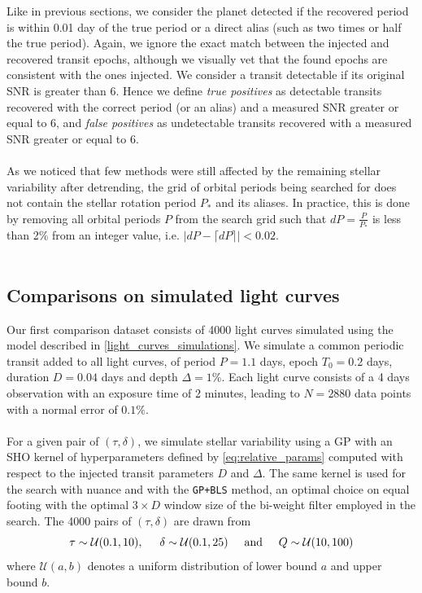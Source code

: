 \documentclass[modern]{aastex631}
\begin{document}
Like in previous sections, we consider the planet detected if the recovered period is within 0.01 day of the true period or a direct alias (such as two times or half the true period). Again, we ignore the exact match between the injected and recovered transit epochs, although we visually vet that the found epochs are consistent with the ones injected. We consider a transit detectable if its original SNR is greater than 6. Hence we define \textit{true positives} as detectable transits recovered with the correct period (or an alias) and a measured SNR greater or equal to 6, and \textit{false positives} as undetectable transits recovered with a measured SNR greater or equal to 6.\\\\As we noticed that few methods were still affected by the remaining stellar variability after detrending, the grid of orbital periods being searched for does not contain the stellar rotation period $P_*$ and its aliases. In practice, this is done by removing all orbital periods $P$ from the search grid such that $dP = \frac{P}{P_*}$ is less than 2\% from an integer value, i.e. $\vert  dP - \lceil dP \rceil \vert < 0.02$.\\\\
\subsection{Comparisons on simulated light curves}\label{simu}
Our first comparison dataset consists of 4000 light curves simulated using the model described in \autoref{light_curves_simulations}. We simulate a common periodic transit added to all light curves, of period $P=1.1$ days, epoch $T_0=0.2$ days, duration $D=0.04$ days and depth $\Delta=1\%$. Each light curve consists of a 4 days observation with an exposure time of 2 minutes, leading to $N=2880$ data points with a normal error of $0.1\%$.\\\\
For a given pair of $(\tau, \delta)$, we simulate stellar variability using a GP with an SHO kernel of hyperparameters defined by \autoref{eq:relative_params} computed with respect to the injected transit parameters $D$ and $\Delta$. The same kernel is used for the search with \textsf{nuance} and with the \texttt{GP+BLS} method, an optimal choice on equal footing with the optimal $3\times D$ window size of the bi-weight filter employed in the \wtls{} search.
The 4000 pairs of $(\tau, \delta)$ are drawn from
\begin{equation*}
    \tau \sim \mathcal{U}(0.1, 10), \hspace{0.5cm} \delta \sim \mathcal{U}(0.1, 25) \hspace{0.5cm}\text{and}\hspace{0.5cm} Q \sim \mathcal{U}(10, 100)
\end{equation*}
where $\mathcal{U}(a, b)$ denotes a uniform distribution of lower bound $a$ and upper bound $b$.\\\\
\end{document}
